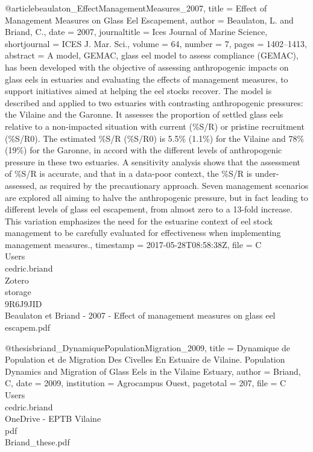 @article{beaulaton_EffectManagementMeasures_2007,
  title = {Effect of Management Measures on Glass Eel Escapement},
  author = {Beaulaton, L. and Briand, C.},
  date = {2007},
  journaltitle = {Ices Journal of Marine Science},
  shortjournal = {ICES J. Mar. Sci.},
  volume = {64},
  number = {7},
  pages = {1402--1413},
  abstract = {A model, GEMAC, glass eel model to assess compliance (GEMAC), has been developed with the objective of assessing anthropogenic impacts on glass eels in estuaries and evaluating the effects of management measures, to support initiatives aimed at helping the eel stocks recover. The model is described and applied to two estuaries with contrasting anthropogenic pressures: the Vilaine and the Garonne. It assesses the proportion of settled glass eels relative to a non-impacted situation with current (\%S/R) or pristine recruitment (\%S/R0). The estimated \%S/R (\%S/R0) is 5.5\% (1.1\%) for the Vilaine and 78\% (19\%) for the Garonne, in accord with the different levels of anthropogenic pressure in these two estuaries. A sensitivity analysis shows that the assessment of \%S/R is accurate, and that in a data-poor context, the \%S/R is under-assessed, as required by the precautionary approach. Seven management scenarios are explored all aiming to halve the anthropogenic pressure, but in fact leading to different levels of glass eel escapement, from almost zero to a 13-fold increase. This variation emphasizes the need for the estuarine context of eel stock management to be carefully evaluated for effectiveness when implementing management measures.},
  timestamp = {2017-05-28T08:58:38Z},
  file = {C\:\\Users\\cedric.briand\\Zotero\\storage\\9R6J9JID\\Beaulaton et Briand - 2007 - Effect of management measures on glass eel escapem.pdf}
}

@thesis{briand_DynamiquePopulationMigration_2009,
  title = {Dynamique de Population et de Migration Des Civelles En Estuaire de {{Vilaine}}. {{Population}} Dynamics and Migration of Glass Eels in the {{Vilaine}} Estuary},
  author = {Briand, C},
  date = {2009},
  institution = {{Agrocampus Ouest}},
  pagetotal = {207},
  file = {C\:\\Users\\cedric.briand\\OneDrive - EPTB Vilaine\\pdf\\Briand_these.pdf}
}

